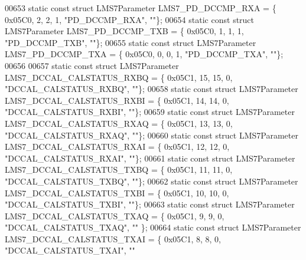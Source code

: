 \begin{DoxyCode}
00653 \textcolor{keyword}{static} \textcolor{keyword}{const} \textcolor{keyword}{struct }LMS7Parameter LMS7_PD_DCCMP_RXA = \{ 0x05C0, 2, 2, 1, \textcolor{stringliteral}{"PD\_DCCMP\_RXA"}, \textcolor{stringliteral}{""}\};
00654 \textcolor{keyword}{static} \textcolor{keyword}{const} \textcolor{keyword}{struct }LMS7Parameter LMS7_PD_DCCMP_TXB = \{ 0x05C0, 1, 1, 1, \textcolor{stringliteral}{"PD\_DCCMP\_TXB"}, \textcolor{stringliteral}{""}\};
00655 \textcolor{keyword}{static} \textcolor{keyword}{const} \textcolor{keyword}{struct }LMS7Parameter LMS7_PD_DCCMP_TXA = \{ 0x05C0, 0, 0, 1, \textcolor{stringliteral}{"PD\_DCCMP\_TXA"}, \textcolor{stringliteral}{""}\};
00656 
00657 \textcolor{keyword}{static} \textcolor{keyword}{const} \textcolor{keyword}{struct }LMS7Parameter LMS7_DCCAL_CALSTATUS_RXBQ = \{ 0x05C1, 15, 15, 0, \textcolor{stringliteral}{"DCCAL\_CALSTATUS\_RXBQ"}, \textcolor{stringliteral}{
      ""}\};
00658 \textcolor{keyword}{static} \textcolor{keyword}{const} \textcolor{keyword}{struct }LMS7Parameter LMS7_DCCAL_CALSTATUS_RXBI = \{ 0x05C1, 14, 14, 0, \textcolor{stringliteral}{"DCCAL\_CALSTATUS\_RXBI"}, \textcolor{stringliteral}{
      ""}\};
00659 \textcolor{keyword}{static} \textcolor{keyword}{const} \textcolor{keyword}{struct }LMS7Parameter LMS7_DCCAL_CALSTATUS_RXAQ = \{ 0x05C1, 13, 13, 0, \textcolor{stringliteral}{"DCCAL\_CALSTATUS\_RXAQ"}, \textcolor{stringliteral}{
      ""}\};
00660 \textcolor{keyword}{static} \textcolor{keyword}{const} \textcolor{keyword}{struct }LMS7Parameter LMS7_DCCAL_CALSTATUS_RXAI = \{ 0x05C1, 12, 12, 0, \textcolor{stringliteral}{"DCCAL\_CALSTATUS\_RXAI"}, \textcolor{stringliteral}{
      ""}\};
00661 \textcolor{keyword}{static} \textcolor{keyword}{const} \textcolor{keyword}{struct }LMS7Parameter LMS7_DCCAL_CALSTATUS_TXBQ = \{ 0x05C1, 11, 11, 0, \textcolor{stringliteral}{"DCCAL\_CALSTATUS\_TXBQ"}, \textcolor{stringliteral}{
      ""}\};
00662 \textcolor{keyword}{static} \textcolor{keyword}{const} \textcolor{keyword}{struct }LMS7Parameter LMS7_DCCAL_CALSTATUS_TXBI = \{ 0x05C1, 10, 10, 0, \textcolor{stringliteral}{"DCCAL\_CALSTATUS\_TXBI"}, \textcolor{stringliteral}{
      ""}\};
00663 \textcolor{keyword}{static} \textcolor{keyword}{const} \textcolor{keyword}{struct }LMS7Parameter LMS7_DCCAL_CALSTATUS_TXAQ = \{ 0x05C1, 9, 9, 0, \textcolor{stringliteral}{"DCCAL\_CALSTATUS\_TXAQ"}, \textcolor{stringliteral}{""}
      \};
00664 \textcolor{keyword}{static} \textcolor{keyword}{const} \textcolor{keyword}{struct }LMS7Parameter LMS7_DCCAL_CALSTATUS_TXAI = \{ 0x05C1, 8, 8, 0, \textcolor{stringliteral}{"DCCAL\_CALSTATUS\_TXAI"}, \textcolor{stringliteral}{""}

\end{DoxyCode}
